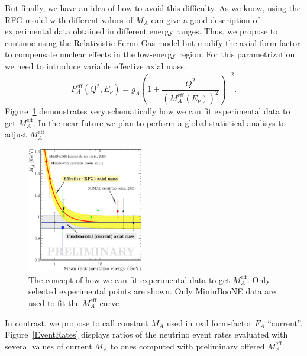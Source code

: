 But finally, we have an idea of how to avoid this difficulty. As we know, using the RFG model with different values of $M_A$ can give a good description of experimental data obtained in different energy ranges. Thus, we propose to continue using the Relativistic Fermi Gas model but modify the axial form factor to compensate nuclear effects in the low-energy region. For this parametrization we need to introduce variable effective axial mass:
\begin{equation}
F_{A}^{\mathrm{eff}}(Q^{2},E_{\nu})=g_{A}\left(1+\frac{Q^{2}}{(M_{A}^{\mathrm{eff}}(E_{\nu}))^{2}}\right)^{-2}.
\end{equation}
Figure~\ref{MA_QES_Effective} demonstrates very schematically how we can fit experimental data to get $M_{A}^{\mathrm{eff}}$. In the near future we plan to perform a global statistical analisys to adjust $M_{A}^{\mathrm{eff}}$.

\begin{figure}[h!]
\begin{center}
\includegraphics[width=0.45\textwidth]{./QES/MA_QES_Effective-2.eps}
\caption{\label{MA_QES_Effective}The concept of how we can fit experimental data to get $M_{A}^{\mathrm{eff}}$. Only selected experimental points are shown. Only MininBooNE data are used to fit the $M_{A}^{\mathrm{eff}}$ curve}
\end{center}
\end{figure}

In contrast, we propose to call constant $M_A$ used in real form-factor $F_A$ ``current''. Figure~\ref{EventRates} displays ratios of the neutrino event rates evaluated with several values of current $M_A$ to ones computed with preliminary offered $M_{A}^{\mathrm{eff}}$.

